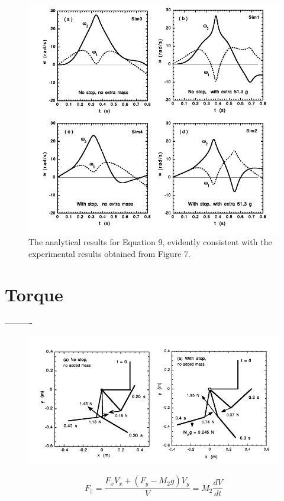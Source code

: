 \documentclass[%
 aip,
 amsmath,amssymb,
 reprint,%
 floatfix,%
]{revtex4-1}
\begin{document}
\begin{figure}[H]
	\centering
	\includegraphics[scale=0.25]{analyticalresults.png}
	\caption{The analytical results for Equation 9, evidently consistent with the experimental results obtained from Figure 7.}
\end{figure}

\section{\label{sec:level4}Torque}
----------
\begin{figure}
	\centering
	\includegraphics[scale=0.3]{torque.png}
	\caption{}
\end{figure}

\begin{equation}
	F_{\parallel}=\frac{F_x V_x + (F_y - M_2 g) V_y}{V} = M_2 \frac{dV}{dt}
\end{equation}
\end{document}
